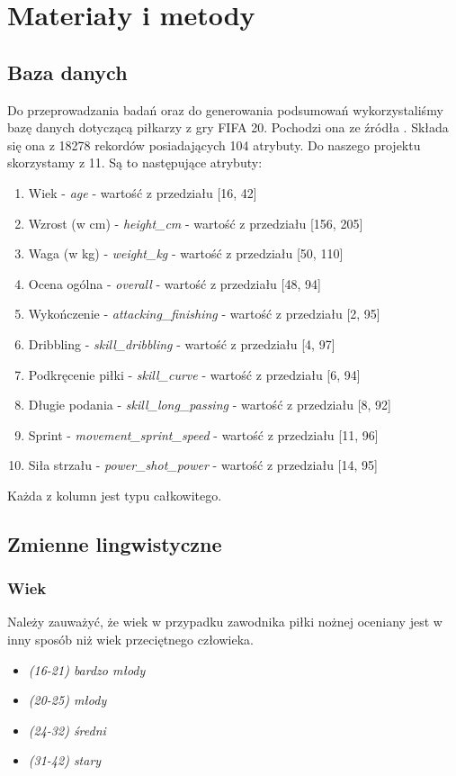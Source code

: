 \documentclass{classrep}
\begin{document}
	\section{Materiały i metody} %
	\subsection{Baza danych}
	Do przeprowadzania badań oraz do generowania podsumowań wykorzystaliśmy bazę danych dotyczącą piłkarzy z gry FIFA 20. Pochodzi ona ze źródła \cite{baza}. Składa się ona z 18278 rekordów posiadających 104 atrybuty. Do naszego projektu skorzystamy z 11. Są to następujące atrybuty:
	
	\begin{enumerate}
		\item Wiek - \textsl{age} - wartość z przedziału [16, 42]
		\item Wzrost (w cm) - \textsl{height\_cm} - wartość z przedziału [156, 205]
		\item Waga (w kg) - \textsl{weight\_kg} - wartość z przedziału [50, 110]
		\item Ocena ogólna - \textsl{overall} - wartość z przedziału [48, 94]
		\item Wykończenie - \textsl{attacking\_finishing} - wartość z przedziału [2, 95]
		\item Dribbling - \textsl{skill\_dribbling} - wartość z przedziału [4, 97]
		\item Podkręcenie piłki - \textsl{skill\_curve} - wartość z przedziału [6, 94]
		\item Długie podania - \textsl{skill\_long\_passing} - wartość z przedziału [8, 92]
		\item Sprint - \textsl{movement\_sprint\_speed} - wartość z przedziału [11, 96]
		\item Siła strzału - \textsl{power\_shot\_power} - wartość z przedziału [14, 95]
	\end{enumerate}

	Każda z kolumn jest typu całkowitego.

	\subsection{Zmienne lingwistyczne}
	\subsubsection{Wiek}
	Należy zauważyć, że wiek w przypadku zawodnika piłki nożnej oceniany jest w inny sposób niż wiek przeciętnego człowieka.
	\begin{itemize}
		\item \textsl{(16-21) bardzo młody}
		\item \textsl{(20-25) młody}
		\item \textsl{(24-32) średni}
		\item \textsl{(31-42) stary}
	\end{itemize}
	
\end{document}
